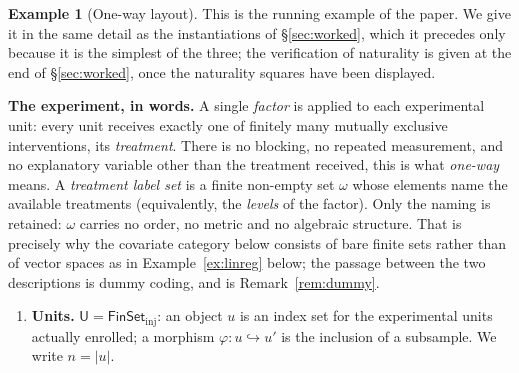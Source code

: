 \documentclass[11pt,a4paper]{article}
\theoremstyle{plain}
\theoremstyle{definition}
\newtheorem{example}[theorem]{Example}
\theoremstyle{remark}
\newcommand{\cat}[1]{\mathsf{#1}}
\newcommand{\catU}{\cat{U}}
\newcommand{\FinSet}{\cat{FinSet}}
\begin{document}
\begin{example}[One-way layout]\label{ex:oneway-setup}
\leavevmode
This is the running example of the paper. We give it in the same detail as the
instantiations of \S\ref{sec:worked}, which it precedes only because it is the
simplest of the three; the verification of naturality is given at the end of
\S\ref{sec:worked}, once the naturality squares have been displayed.

\medskip
\noindent\textbf{The experiment, in words.} A single \emph{factor} is applied
to each experimental unit: every unit receives exactly one of finitely many
mutually exclusive interventions, its \emph{treatment}. There is no blocking,
no repeated measurement, and no explanatory variable other than the treatment
received, this is what \emph{one-way} means. A \emph{treatment label set}
is a finite non-empty set $\omega$ whose elements name the available
treatments (equivalently, the \emph{levels} of the factor). Only the naming is
retained: $\omega$ carries no order, no metric and no algebraic structure.
That is precisely why the covariate category below consists of bare finite
sets rather than of vector spaces as in Example~\ref{ex:linreg} below; the passage
between the two descriptions is dummy coding, and is
Remark~\ref{rem:dummy}.

\begin{enumerate}
\item \textbf{Units.} $\catU = \FinSet_{\mathrm{inj}}$: an object $u$ is an
index set for the experimental units actually enrolled; a morphism
$\varphi \colon u \hookrightarrow u'$ is the inclusion of a subsample. We
write $n = |u|$.


\end{enumerate}
\end{example}
\end{document}
